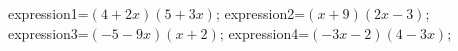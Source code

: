 \documentclass[exercice]{thedocument}%
\begin{document}
%
    \>expression1=$(4+2x)(5+3x)$;%
    \>expression2=$(x+9)(2x-3)$;%
    \>expression3=$(-5-9x)(x+2)$;%
    \>expression4=$(-3x-2)(4-3x)$;%
\end{document}
